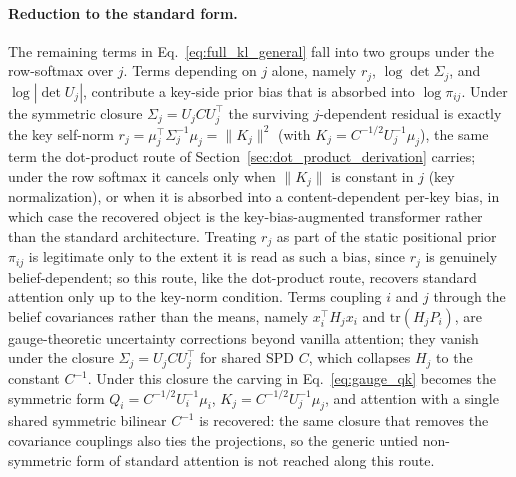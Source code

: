 \documentclass[11pt]{article}
\begin{document}
\paragraph{Reduction to the standard form.}
The remaining terms in Eq.~\eqref{eq:full_kl_general} fall into two groups under the row-softmax over $j$. Terms depending on $j$ alone, namely $r_j$, $\log\det\Sigma_j$, and $\log|\det U_j|$, contribute a key-side prior bias that is absorbed into $\log\pi_{ij}$. Under the symmetric closure $\Sigma_j = U_j C U_j^\top$ the surviving $j$-dependent residual is exactly the key self-norm $r_j = \mu_j^\top\Sigma_j^{-1}\mu_j = \|K_j\|^2$ (with $K_j = C^{-1/2}U_j^{-1}\mu_j$), the same term the dot-product route of Section~\ref{sec:dot_product_derivation} carries; under the row softmax it cancels only when $\|K_j\|$ is constant in $j$ (key normalization), or when it is absorbed into a content-dependent per-key bias, in which case the recovered object is the key-bias-augmented transformer rather than the standard architecture. Treating $r_j$ as part of the static positional prior $\pi_{ij}$ is legitimate only to the extent it is read as such a bias, since $r_j$ is genuinely belief-dependent; so this route, like the dot-product route, recovers standard attention only up to the key-norm condition. Terms coupling $i$ and $j$ through the belief covariances rather than the means, namely $x_i^\top H_j x_i$ and $\mathrm{tr}(H_j P_i)$, are gauge-theoretic uncertainty corrections beyond vanilla attention; they vanish under the closure $\Sigma_j = U_j C U_j^\top$ for shared SPD $C$, which collapses $H_j$ to the constant $C^{-1}$. Under this closure the carving in Eq.~\eqref{eq:gauge_qk} becomes the symmetric form $Q_i = C^{-1/2}U_i^{-1}\mu_i$, $K_j = C^{-1/2}U_j^{-1}\mu_j$, and attention with a single shared symmetric bilinear $C^{-1}$ is recovered: the same closure that removes the covariance couplings also ties the projections, so the generic untied non-symmetric form of standard attention is not reached along this route.
\end{document}
